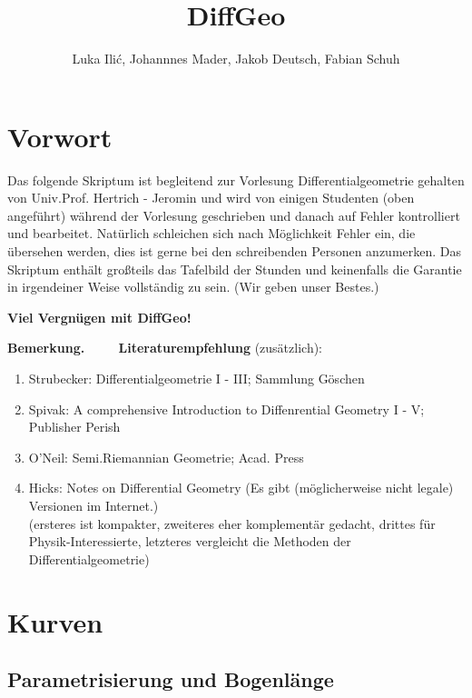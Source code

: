 \documentclass[a4paper,oneside,11pt,DIV=12,parskip=half]{scrartcl}
\title{DiffGeo}
\author{ Luka Ili\'{c}, Johannnes Mader, Jakob Deutsch, Fabian Schuh}
\newenvironment{note}{\textbf{Bemerkung.} ~~~~}{}
\newenvironment{lemma, definition}{\textbf{Lemma und Definition.} ~~~~}{}
\newenvironment{note, example}{\textbf{Bemerkung und Beispiel.} ~~~~}{}
\newenvironment{note, definition}{\textbf{Bemerkung und Definition.} ~~~~}{}
\begin{document}
	
	\maketitle
	
	\pagebreak
	
	\tableofcontents
	
	\pagebreak
	
\section*{Vorwort} 
Das folgende Skriptum ist begleitend zur Vorlesung Differentialgeometrie gehalten von Univ.Prof. Hertrich - Jeromin und wird von einigen Studenten (oben angeführt) während der Vorlesung geschrieben und danach auf Fehler kontrolliert und bearbeitet. Natürlich schleichen sich nach Möglichkeit Fehler ein, die übersehen werden, dies ist gerne bei den schreibenden Personen anzumerken.
Das Skriptum enthält großteils das Tafelbild der Stunden und keinenfalls die Garantie in irgendeiner Weise vollständig zu sein. (Wir geben unser Bestes.)

\textbf{Viel Vergnügen mit DiffGeo!}

\begin{note}
	\textbf{Literaturempfehlung} (zusätzlich): \begin{enumerate}
		\item Strubecker: Differentialgeometrie I - III; Sammlung Göschen
		\item Spivak: A comprehensive Introduction to Diffenrential Geometry I - V; Publisher Perish
		\item O'Neil: Semi.Riemannian Geometrie; Acad. Press
		\item Hicks: Notes on Differential Geometry (Es gibt (möglicherweise nicht legale) Versionen im Internet.)\\
		(ersteres ist kompakter, zweiteres eher komplementär gedacht, drittes für Physik-Interessierte, letzteres vergleicht die Methoden der Differentialgeometrie)
	\end{enumerate}
\end{note}
\pagebreak
	
\section{Kurven}
\subsection{Parametrisierung und Bogenlänge}
\end{document}
